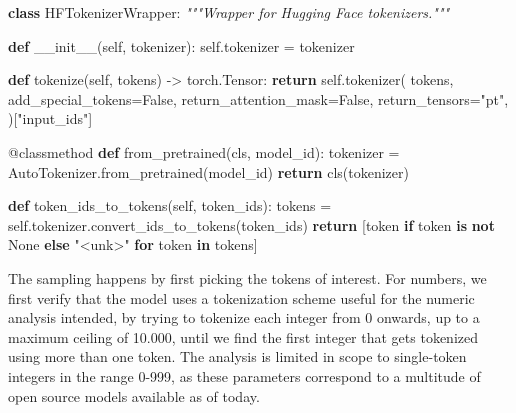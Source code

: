 \documentclass[
  a4paper, twoside, 10pt, titlepage]{book}
\newenvironment{Shaded}{}{}
\newcommand{\AttributeTok}[1]{\textcolor[rgb]{0.49,0.56,0.16}{#1}}
\newcommand{\CommentTok}[1]{\textcolor[rgb]{0.38,0.63,0.69}{\textit{#1}}}
\newcommand{\ControlFlowTok}[1]{\textcolor[rgb]{0.00,0.44,0.13}{\textbf{#1}}}
\newcommand{\FunctionTok}[1]{\textcolor[rgb]{0.02,0.16,0.49}{#1}}
\newcommand{\KeywordTok}[1]{\textcolor[rgb]{0.00,0.44,0.13}{\textbf{#1}}}
\newcommand{\NormalTok}[1]{#1}
\newcommand{\OperatorTok}[1]{\textcolor[rgb]{0.40,0.40,0.40}{#1}}
\newcommand{\StringTok}[1]{\textcolor[rgb]{0.25,0.44,0.63}{#1}}
\newcommand{\VariableTok}[1]{\textcolor[rgb]{0.10,0.09,0.49}{#1}}
\begin{document}
\begin{Shaded}
\begin{Highlighting}[]
\KeywordTok{class}\NormalTok{ HFTokenizerWrapper:}
    \CommentTok{"""Wrapper for Hugging Face tokenizers."""}

    \KeywordTok{def} \FunctionTok{\_\_init\_\_}\NormalTok{(}\VariableTok{self}\NormalTok{, tokenizer):}
        \VariableTok{self}\NormalTok{.tokenizer }\OperatorTok{=}\NormalTok{ tokenizer}

    \KeywordTok{def}\NormalTok{ tokenize(}\VariableTok{self}\NormalTok{, tokens) }\OperatorTok{{-}\textgreater{}}\NormalTok{ torch.Tensor:}
        \ControlFlowTok{return} \VariableTok{self}\NormalTok{.tokenizer(}
\NormalTok{            tokens,}
\NormalTok{            add\_special\_tokens}\OperatorTok{=}\VariableTok{False}\NormalTok{,}
\NormalTok{            return\_attention\_mask}\OperatorTok{=}\VariableTok{False}\NormalTok{,}
\NormalTok{            return\_tensors}\OperatorTok{=}\StringTok{"pt"}\NormalTok{,}
\NormalTok{        )[}\StringTok{"input\_ids"}\NormalTok{]}

    \AttributeTok{@classmethod}
    \KeywordTok{def}\NormalTok{ from\_pretrained(cls, model\_id):}
\NormalTok{        tokenizer }\OperatorTok{=}\NormalTok{ AutoTokenizer.from\_pretrained(model\_id)}
        \ControlFlowTok{return}\NormalTok{ cls(tokenizer)}

    \KeywordTok{def}\NormalTok{ token\_ids\_to\_tokens(}\VariableTok{self}\NormalTok{, token\_ids):}
\NormalTok{        tokens }\OperatorTok{=} \VariableTok{self}\NormalTok{.tokenizer.convert\_ids\_to\_tokens(token\_ids)}
        \ControlFlowTok{return}\NormalTok{ [token }\ControlFlowTok{if}\NormalTok{ token }\KeywordTok{is} \KeywordTok{not} \VariableTok{None} \ControlFlowTok{else} \StringTok{"\textless{}unk\textgreater{}"} \ControlFlowTok{for}\NormalTok{ token }\KeywordTok{in}\NormalTok{ tokens]}
\end{Highlighting}
\end{Shaded}

The sampling happens by first picking the tokens of interest. For
numbers, we first verify that the model uses a tokenization scheme
useful for the numeric analysis intended, by trying to tokenize each
integer from 0 onwards, up to a maximum ceiling of 10.000, until we find
the first integer that gets tokenized using more than one token. The
analysis is limited in scope to single-token integers in the range
0-999, as these parameters correspond to a multitude of open source
models available as of today.
\end{document}

